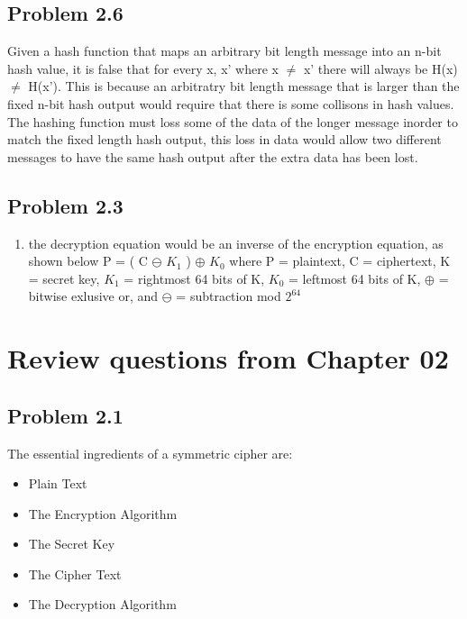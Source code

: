 \documentclass[14pt]{article}
\begin{document}
\subsection{Problem  2.6}
Given a hash function that maps an arbitrary bit length message into an n-bit hash value, it is false that for every x, x' where x $\neq$ x' there will always be H(x) $\neq$ H(x'). This is because an arbitratry bit length message that is larger than the fixed n-bit hash output would require that there is some collisons in hash values. The hashing function must loss some of the data of the longer message inorder to match the fixed length hash output, this loss in data would allow two different messages to have the same hash output after the extra data has been lost. 

\subsection{Problem  2.3}
\begin{enumerate}[label=(\alph*)]
\item the decryption equation would be an inverse of the encryption equation, as shown below
\newline
 P = ( C $\ominus$ $ K_{1}$ ) $\oplus$ $K_{0}$
\newline
where P = plaintext, C = ciphertext, K = secret key, $K_{1}$ = rightmost 64 bits of K, $K_{0}$ = leftmost 64 bits of K, $\oplus$ = bitwise exlusive or, and $\ominus$ = subtraction mod $2^{64}$
\end{enumerate}


\newpage


\section{Review questions from Chapter 02}

\subsection{Problem  2.1}
The essential ingredients of a symmetric cipher are:
\begin{itemize}
\item Plain Text
\item The Encryption Algorithm
\item The Secret Key
\item The Cipher Text
\item The Decryption Algorithm
\end{itemize}
\end{document}
